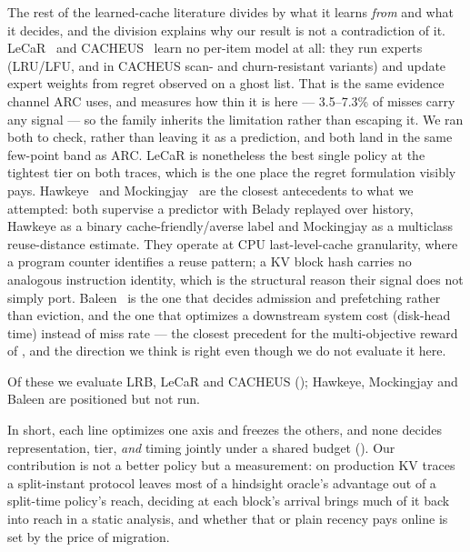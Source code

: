 The rest of the learned-cache literature divides by what it learns \emph{from} and what it decides, and
the division explains why our result is not a contradiction of it.
LeCaR~\cite{S8_vietri2018lecar} and CACHEUS~\cite{S9_rodriguez2021cacheus} learn no per-item model at all:
they run experts (LRU/LFU, and in CACHEUS scan- and churn-resistant variants) and update expert weights
from regret observed on a ghost list. That is the same evidence channel ARC uses, and
 measures how thin it is here --- 3.5--7.3\% of misses carry any signal --- so the
family inherits the limitation rather than escaping it. We ran both to check, rather than leaving it as a
prediction, and both land in the same few-point band as ARC. LeCaR is nonetheless the best single policy
at the tightest tier on both traces, which is the one place the regret formulation visibly pays.
Hawkeye~\cite{S10_jain2016hawkeye} and Mockingjay~\cite{S11_shah2022mockingjay} are the closest
antecedents to what we attempted: both supervise a predictor with Belady replayed over history, Hawkeye
as a binary cache-friendly/averse label and Mockingjay as a multiclass reuse-distance estimate. They
operate at CPU last-level-cache granularity, where a program counter identifies a reuse pattern; a KV
block hash carries no analogous instruction identity, which is the structural reason their signal does
not simply port. Baleen~\cite{S12_wong2024baleen} is the one that decides admission and prefetching
rather than eviction, and the one that optimizes a downstream system cost (disk-head time) instead of
miss rate --- the closest precedent for the multi-objective reward of , and the
direction we think is right even though we do not evaluate it here.

Of these we evaluate LRB, LeCaR and CACHEUS (); Hawkeye, Mockingjay and Baleen are
positioned but not run.

In short, each line optimizes one axis and freezes the others, and none decides representation, tier,
\emph{and} timing jointly under a shared budget (). Our contribution is not a better
policy but a measurement: on production KV traces a split-instant protocol leaves most of a hindsight
oracle's advantage out of a split-time policy's reach, deciding at each block's arrival brings much of it
back into reach in a static analysis, and whether that or plain recency pays online is set by the price
of migration.
